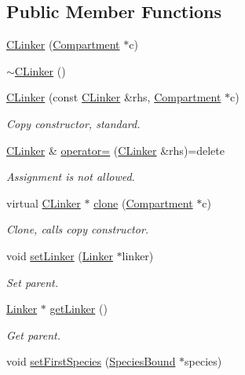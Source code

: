 \subsection*{Public Member Functions}
\begin{DoxyCompactItemize}
\item 
\hyperlink{classCLinker_a553ee3b26b16b70deaf78b153af39583}{C\+Linker} (\hyperlink{classCompartment}{Compartment} $\ast$c)
\item 
\hyperlink{classCLinker_a1735e2ca0212e6e1c0696d1f21ffebd5}{$\sim$\+C\+Linker} ()
\item 
\hyperlink{classCLinker_a8c28d338aed63e709cc2c9a449fd9d19}{C\+Linker} (const \hyperlink{classCLinker}{C\+Linker} \&rhs, \hyperlink{classCompartment}{Compartment} $\ast$c)
\begin{DoxyCompactList}\small\item\em Copy constructor, standard. \end{DoxyCompactList}\item 
\hyperlink{classCLinker}{C\+Linker} \& \hyperlink{classCLinker_a6aa5d662e52c5c0d726616647210f467}{operator=} (\hyperlink{classCLinker}{C\+Linker} \&rhs)=delete
\begin{DoxyCompactList}\small\item\em Assignment is not allowed. \end{DoxyCompactList}\item 
virtual \hyperlink{classCLinker}{C\+Linker} $\ast$ \hyperlink{classCLinker_ab1fba3ef14c902ed103e54c44ffa7538}{clone} (\hyperlink{classCompartment}{Compartment} $\ast$c)
\begin{DoxyCompactList}\small\item\em Clone, calls copy constructor. \end{DoxyCompactList}\item 
void \hyperlink{classCLinker_a2b0219ae91d2312bbf0c998b4d0b124e}{set\+Linker} (\hyperlink{classLinker}{Linker} $\ast$linker)
\begin{DoxyCompactList}\small\item\em Set parent. \end{DoxyCompactList}\item 
\hyperlink{classLinker}{Linker} $\ast$ \hyperlink{classCLinker_a5a1435f2035ecdadcc35b4ae90199865}{get\+Linker} ()
\begin{DoxyCompactList}\small\item\em Get parent. \end{DoxyCompactList}\item 
void \hyperlink{classCBound_a17d4b84d683b0b7bd75b793410fed18f}{set\+First\+Species} (\hyperlink{classSpeciesBound}{Species\+Bound} $\ast$species)

\end{DoxyCompactItemize}
